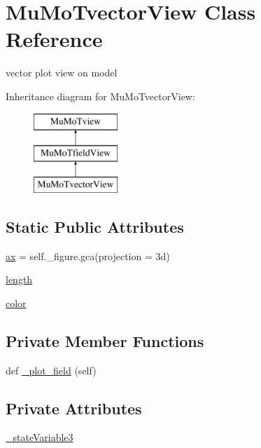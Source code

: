 \hypertarget{class_mu_mo_t_1_1_mu_mo_tvector_view}{}\section{Mu\+Mo\+Tvector\+View Class Reference}
\label{class_mu_mo_t_1_1_mu_mo_tvector_view}


vector plot view on model  


Inheritance diagram for Mu\+Mo\+Tvector\+View\+:\begin{figure}[H]
\begin{center}
\leavevmode
\includegraphics[height=3.000000cm]{class_mu_mo_t_1_1_mu_mo_tvector_view}
\end{center}
\end{figure}
\subsection*{Static Public Attributes}
\begin{DoxyCompactItemize}
\item 
\hyperlink{class_mu_mo_t_1_1_mu_mo_tvector_view_a8fa675eb2fcec5b95d9d21c670da7f30}{ax} = self.\+\_\+figure.\+gca(projection = \textquotesingle{}3d\textquotesingle{})
\item 
\hyperlink{class_mu_mo_t_1_1_mu_mo_tvector_view_af9d495c1655d813d553030485d00fea7}{length}
\item 
\hyperlink{class_mu_mo_t_1_1_mu_mo_tvector_view_a37dbdc30935031c05304482e1be89d8f}{color}
\end{DoxyCompactItemize}
\subsection*{Private Member Functions}
\begin{DoxyCompactItemize}
\item 
def \hyperlink{class_mu_mo_t_1_1_mu_mo_tvector_view_a50d59419298116f738a98c864afb9d89}{\+\_\+plot\+\_\+field} (self)
\end{DoxyCompactItemize}
\subsection*{Private Attributes}
\begin{DoxyCompactItemize}
\item 
\hyperlink{class_mu_mo_t_1_1_mu_mo_tvector_view_ad2f8dc44173a16468bd9d3ab335f9b27}{\+\_\+state\+Variable3}
\end{DoxyCompactItemize}
